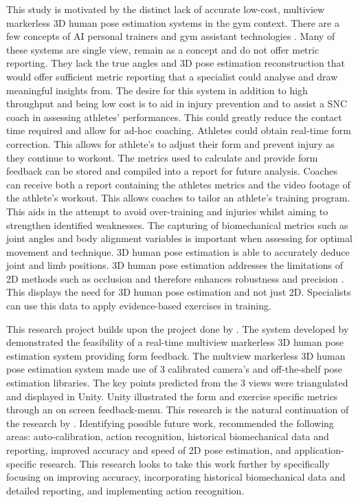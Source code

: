 This study is motivated by the distinct lack of accurate low-cost, multiview markerless 3D human pose estimation systems in the gym context. There are a few concepts of AI personal trainers and gym assistant technologies \cite{Fieraru2021, appiah2024mobile, Chen2020, Dedhia2023}. Many of these systems are single view, remain as a concept and do not offer metric reporting. They lack the true angles and 3D pose estimation reconstruction that would offer sufficient metric reporting that a specialist could analyse and draw meaningful insights from.
The desire for this system in addition to high throughput and being low cost is to aid in injury prevention and to assist a SNC coach in assessing athletes' performances. This could greatly reduce the contact time required and allow for ad-hoc coaching. Athletes could obtain real-time form correction. This allows for athlete's to adjust their form and prevent injury as they continue to workout. The metrics used to calculate and provide form feedback can be stored and compiled into a report for future analysis. Coaches can receive both a report containing the athletes metrics and the video footage of the athlete's workout. This allows coaches to tailor an athlete's training program. This aids in the attempt to avoid over-training and injuries whilst aiming to strengthen identified weaknesses.
The capturing of biomechanical metrics such as joint angles and body alignment variables is important when assessing for optimal movement and technique. 3D human pose estimation is able to accurately deduce joint and limb positions. 3D human pose estimation addresses the limitations of 2D methods such as occlusion and therefore enhances robustness and precision \cite{Sun2025}.
This displays the need for 3D human pose estimation and not just 2D. Specialists can use this data to apply evidence-based exercises in training. 

This research project builds upon the project done by \citet{steyn2024markerless}.
The system developed by \citet{steyn2024markerless} demonstrated the feasibility of a real-time multiview markerless 3D human pose estimation system providing form feedback. The multview markerless 3D human pose estimation system made use of 3 calibrated camera's and off-the-shelf pose estimation libraries. The key points predicted from the 3 views were triangulated and displayed in Unity. Unity illustrated the form and exercise specific metrics through an on screen feedback-menu. This research is the natural continuation of the research by \citet{steyn2024markerless}. Identifying possible future work, \citet{steyn2024markerless} recommended the following areas: auto-calibration, action recognition, historical biomechanical data and reporting, improved accuracy and speed of 2D pose estimation, and application-specific research. 
This research looks to take this work further by specifically focusing on improving accuracy, incorporating historical biomechanical data and detailed reporting, and implementing action recognition.

